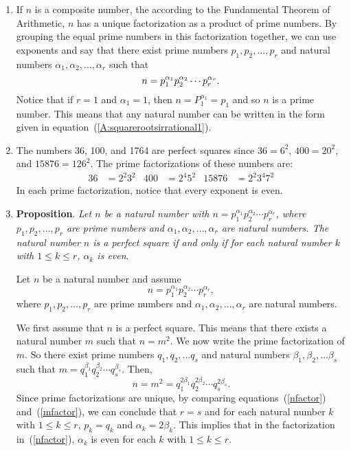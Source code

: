 \documentclass[11pt]{article}
\begin{document}
\begin{enumerate}
\item If $n$ is a composite number, the according to the Fundamental Theorem of Arithmetic, $n$ has a unique factorization as a product of prime numbers.  By grouping the equal prime numbers in this factorization together, we can use exponents and say that there exist prime numbers 
$p_1, p_2, \ldots, p_r$ and natural numbers 
$\alpha_1, \alpha_2, \ldots, \alpha_r$ such that
\begin{equation}\label{A:squarerootsirrational1}
n = p_1^{\alpha_1} p_2^{\alpha_2} \cdots p_r^{\alpha_r} \notag.
\end{equation} 
Notice that if $r = 1$ and $\alpha_1 = 1$, then $n = P_1^{\alpha_1} = p_1$ and so $n$ is a prime number.  This means that any natural number can be written in the form given in 
equation~(\ref{A:squarerootsirrational1}).


\item  The numbers 36, 100, and 1764 are perfect squares since $36 = 6^2$, $400 = 20^2$, and
$15876 = 126^2$.  The prime factorizations of these numbers are:
\begin{align*}
36 &= 2^2 3^2  &  400 &= 2^4 5^2  &  15876 &= 2^2 3^4 7^2 
\end{align*}
In each prime factorization, notice that every exponent is even.



\item \textbf{Proposition}. \emph{Let $n$ be a natural number with 
$n = p_1^{\alpha_1} p_2^{\alpha_2} \cdots p_r^{\alpha_r}$, where $p_1, p_2, \ldots, p_r$ are prime numbers and $\alpha_1, \alpha_2, \ldots, \alpha_r$ are natural numbers.  The natural number $n$ is a perfect square if and only if for each natural number $k$ with $1 \leq k \leq r$, $\alpha_k$ is even}.

\begin{myproof}
Let $n$ be a natural number and assume 
\begin{equation}\label{nfactor}
n = p_1^{\alpha_1} p_2^{\alpha_2} \cdots p_r^{\alpha_r},
\end{equation} where $p_1, p_2, \ldots, p_r$ are prime numbers and $\alpha_1, \alpha_2, \ldots, \alpha_r$ are natural numbers.

We first assume that $n$ is a perfect square.  This means that there exists a natural number $m$ such that $n = m^2$.  We now write the prime factorization of $m$.  So there exist prime numbers $q_1, q_2, \ldots q_s$ and natural numbers $\beta_1, \beta_2, \ldots \beta_s$ such that 
$m = q_1^{\beta_1} q_2^{\beta_2} \cdots q_s^{\beta_s}$.  Then,
\begin{equation}\label{mfactor}
n = m^2 = q_1^{2 \beta_1} q_2^{2 \beta_2} \cdots q_s^{2\beta_s}.
\end{equation}
Since prime factorizations are unique, by comparing equations~(\ref{nfactor}) 
and~(\ref{mfactor}), we can conclude that $r = s$ and for each natural number $k$ with 
$1 \leq k \leq r$, $p_k = q_k$ and $\alpha_k = 2 \beta_k$.  This implies that in the factorization in~(\ref{nfactor}), $\alpha_k$ is even for each $k$ with $1 \leq k \leq r$.


\end{myproof}
\end{enumerate}
\end{document}
